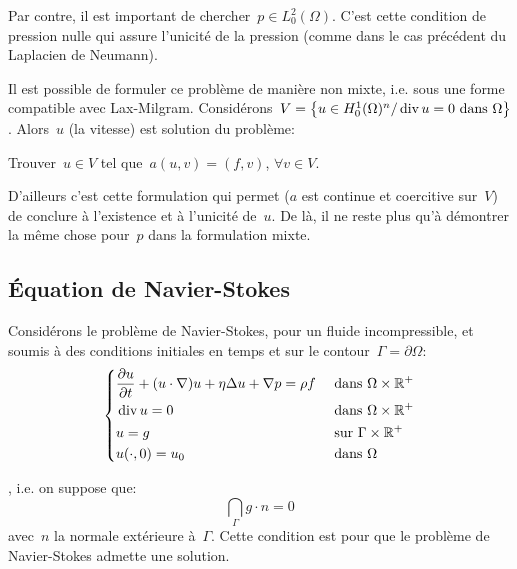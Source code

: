 Par contre, il est important de chercher~$p \in L^2_0(\Omega)$. C'est cette condition de pression nulle qui assure l'unicité de la pression (comme dans le cas précédent du Laplacien de Neumann).

\medskip
Il est possible de formuler ce problème de manière non mixte, i.e. sous une forme compatible avec Lax-Milgram.
Considérons~$V=\left\{ u\in H^1_0(\Omega)^n / \operatorname{div} u=0 \text{ dans } \Omega\right\}$.
Alors~$u$ (la vitesse) est solution du problème:
\begin{center}
Trouver~$u\in V$ tel que~$a(u,v)=(f,v)$, $\forall v\in V$.
\end{center}
D'ailleurs c'est cette formulation qui permet ($a$ est continue et coercitive sur~$V$) de conclure à l'existence et à l'unicité de~$u$. De là, il ne reste plus qu'à démontrer la même chose pour~$p$ dans la formulation mixte.

\medskip
\subsection{Équation de Navier-Stokes}

Considérons le problème de Navier-Stokes, pour un fluide incompressible, et soumis à des conditions initiales en temps et sur le contour~$\Gamma=\partial\Omega$:
\begin{equation}\left\{
\begin{aligned}
&\dfrac{\partial u}{\partial t} + (u\cdot\nabla) u + \eta\Delta u + \nabla p = \rho f && \text{ dans } \Omega\times\mathbb R^+\\
&\operatorname{div} u = 0&& \text{ dans } \Omega\times\mathbb R^+\\
&u=g &&\text{ sur } \Gamma\times\mathbb R^+\\
&u(\cdot,0) =u_0 &&\text{ dans }\Omega
\end{aligned}\right.
\end{equation}

, i.e. on suppose que:
\begin{equation}
\dint_\Gamma g\cdot n %
= 0
\end{equation}
avec~$n$ la normale extérieure à~$\Gamma$. Cette condition est  pour que le problème de Navier-Stokes admette une solution.

